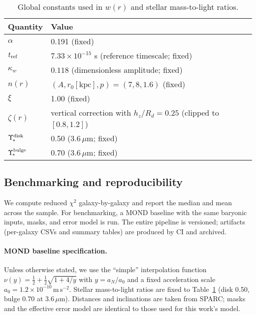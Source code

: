 \documentclass[twocolumn,prd,amsmath,amssymb,aps,superscriptaddress,nofootinbib]{revtex4-2}
\begin{document}
\begin{table}[t]
\centering
\caption{Global constants used in $w(r)$ and stellar mass-to-light ratios.}
\label{tab:globals}
\begin{tabular}{l l}
\toprule
Quantity & Value\\
\midrule
$\alpha$ & 0.191 (fixed)\\
$t_{\rm ref}$ & $7.33\times10^{-15}$ s (reference timescale; fixed)\\
$\kappa_{w}$ & $0.118$ (dimensionless amplitude; fixed)\\
$n(r)$ & $(A, r_0[\mathrm{kpc}], p)=(7,8,1.6)$ (fixed)\\
$\xi$ & 1.00 (fixed)\\
$\zeta(r)$ & vertical correction with $h_z/R_d=0.25$ (clipped to $[0.8,1.2]$)\\
$\Upsilon_{\!*}^{\rm disk}$ & 0.50 (3.6$\,\mu$m; fixed)\\
$\Upsilon_{\!*}^{\rm bulge}$ & 0.70 (3.6$\,\mu$m; fixed)\\
\bottomrule
\end{tabular}
\end{table}

\subsection{Benchmarking and reproducibility}
We compute reduced $\chi^2$ galaxy-by-galaxy and report the median and mean across the sample. For benchmarking, a MOND baseline with the same baryonic inputs, masks, and error model is run. The entire pipeline is versioned; artifacts (per-galaxy CSVs and summary tables) are produced by CI and archived.

\paragraph*{MOND baseline specification.} Unless otherwise stated, we use the “simple” interpolation function $\nu(y)=\tfrac12+\tfrac12\sqrt{1+4/y}$ with $y=a_N/a_0$ and a fixed acceleration scale $a_0=1.2\times10^{-10}\,\mathrm{m\,s^{-2}}$. Stellar mass-to-light ratios are fixed to Table~\ref{tab:globals} (disk 0.50, bulge 0.70 at 3.6$\,\mu$m). Distances and inclinations are taken from SPARC; masks and the effective error model are identical to those used for this work’s model.
\end{document}

